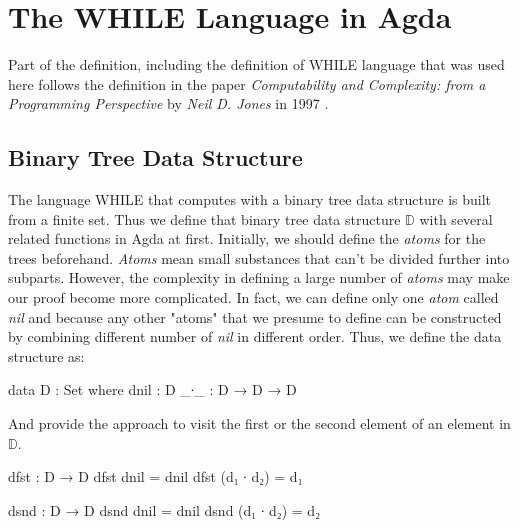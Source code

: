 \documentclass{jfrarticle}
\begin{document}
\section{The WHILE Language in Agda}
Part of the definition, including the definition of WHILE language that was used here follows the definition in the paper \textit{Computability and Complexity: from a Programming Perspective} by \textit{Neil D. Jones} in 1997 \cite{jones_computability_1997}.
\subsection{Binary Tree Data Structure}
The language WHILE that computes with a binary tree data structure is built from a finite set. 
Thus we define that binary tree data structure $\mathds{D}$ with several related functions in Agda at first.
Initially, we should define the \textit{atoms} for the trees beforehand.
\textit{Atoms} mean small substances that can't be divided further into subparts.
However, the complexity in defining a large number of \textit{atoms} may make our proof become more complicated.
In fact, we can define only one \textit{atom} called \textit{nil} and because any other "atoms" that we presume to define can be constructed by combining different number of \textit{nil} in different order.
Thus, we define the data structure as:
\begin{code}[fontsize=\small]
data D : Set where
  dnil : D 
  _∙_  : D → D → D
\end{code}
And provide the approach to visit the first or the second element of an element in $\mathds{D}$.
\begin{code}[fontsize=\small]
dfst : D → D
dfst dnil = dnil
dfst (d₁ ∙ d₂) = d₁

dsnd : D → D
dsnd dnil = dnil
dsnd (d₁ ∙ d₂) = d₂
\end{code}
\end{document}
